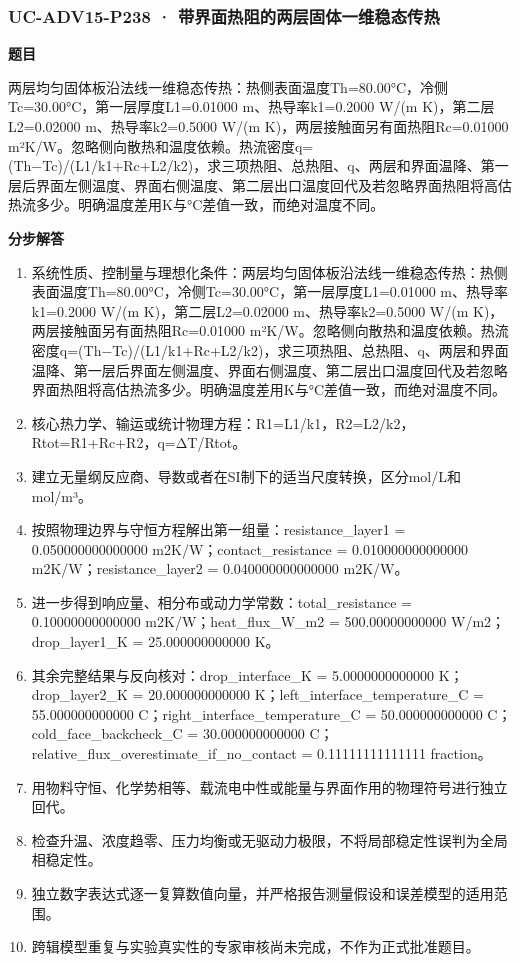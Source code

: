 \documentclass[UTF8,11pt,a4paper]{ctexart}
\begin{document}
\subsubsection*{UC-ADV15-P238 · 带界面热阻的两层固体一维稳态传热}
\noindent\textbf{题目}\par
两层均匀固体板沿法线一维稳态传热：热侧表面温度Th=80.00°C，冷侧Tc=30.00°C，第一层厚度L1=0.01000 m、热导率k1=0.2000 W/(m K)，第二层L2=0.02000 m、热导率k2=0.5000 W/(m K)，两层接触面另有面热阻Rc=0.01000 m²K/W。忽略侧向散热和温度依赖。热流密度q=(Th−Tc)/(L1/k1+Rc+L2/k2)，求三项热阻、总热阻、q、两层和界面温降、第一层后界面左侧温度、界面右侧温度、第二层出口温度回代及若忽略界面热阻将高估热流多少。明确温度差用K与°C差值一致，而绝对温度不同。\par
\medskip\noindent\textbf{分步解答}
\begin{enumerate}
\item 系统性质、控制量与理想化条件：两层均匀固体板沿法线一维稳态传热：热侧表面温度Th=80.00°C，冷侧Tc=30.00°C，第一层厚度L1=0.01000 m、热导率k1=0.2000 W/(m K)，第二层L2=0.02000 m、热导率k2=0.5000 W/(m K)，两层接触面另有面热阻Rc=0.01000 m²K/W。忽略侧向散热和温度依赖。热流密度q=(Th−Tc)/(L1/k1+Rc+L2/k2)，求三项热阻、总热阻、q、两层和界面温降、第一层后界面左侧温度、界面右侧温度、第二层出口温度回代及若忽略界面热阻将高估热流多少。明确温度差用K与°C差值一致，而绝对温度不同。
\item 核心热力学、输运或统计物理方程：R1=L1/k1，R2=L2/k2，Rtot=R1+Rc+R2，q=ΔT/Rtot。
\item 建立无量纲反应商、导数或者在SI制下的适当尺度转换，区分mol/L和mol/m³。
\item 按照物理边界与守恒方程解出第一组量：resistance\_layer1 = 0.050000000000000 m2K/W；contact\_resistance = 0.010000000000000 m2K/W；resistance\_layer2 = 0.040000000000000 m2K/W。
\item 进一步得到响应量、相分布或动力学常数：total\_resistance = 0.10000000000000 m2K/W；heat\_flux\_W\_m2 = 500.00000000000 W/m2；drop\_layer1\_K = 25.000000000000 K。
\item 其余完整结果与反向核对：drop\_interface\_K = 5.0000000000000 K；drop\_layer2\_K = 20.000000000000 K；left\_interface\_temperature\_C = 55.000000000000 C；right\_interface\_temperature\_C = 50.000000000000 C；cold\_face\_backcheck\_C = 30.000000000000 C；relative\_flux\_overestimate\_if\_no\_contact = 0.11111111111111 fraction。
\item 用物料守恒、化学势相等、载流电中性或能量与界面作用的物理符号进行独立回代。
\item 检查升温、浓度趋零、压力均衡或无驱动力极限，不将局部稳定性误判为全局相稳定性。
\item 独立数字表达式逐一复算数值向量，并严格报告测量假设和误差模型的适用范围。
\item 跨辑模型重复与实验真实性的专家审核尚未完成，不作为正式批准题目。
\end{enumerate}
\end{document}
